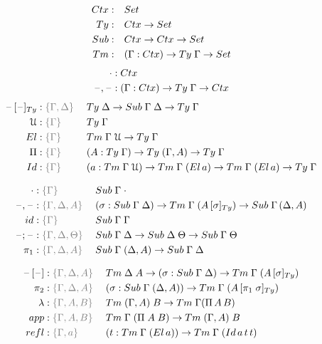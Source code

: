 \documentclass[a4paper,UKenglish,numberwithinsect,cleveref,thm-restate]{lipics-v2021}
\begin{document}
\begin{alignat*}{3}
  \Ctx      & : && \Set                   \\
  \Ty       & : && \Ctx \to \Set          \\
  \Sub      & : && \Ctx \to \Ctx \to \Set \\
  \Tm       & : && (\Gamma : \Ctx) \to \Ty\;\Gamma \to \Set
\end{alignat*}
\begin{alignat*}{5}
  \emptyctx     & : \Ctx \\
  \blank,\blank & : (\Gamma : \Ctx) \to \Ty\;\Gamma \to \Ctx
\end{alignat*}
\begin{alignat*}{5}
\subTy{\blank}{\blank} & : \implicit{\Gamma, \Delta}\; && \Ty\;\Delta \to \Sub\;\Gamma\;\Delta \to \Ty\;\Gamma \\
  \UU         & : \implicit{\Gamma}\; && \Ty\; \Gamma \\
  \El         & : \implicit{\Gamma}\; && \Tm\;\Gamma\;\UU \to \Ty\;\Gamma \\
  \Pi         & : \implicit{\Gamma}\; && (A : \Ty\;\Gamma) \to \Ty\;(\Gamma, A) \to \Ty\;\Gamma \\
  \mathsf{Id} & : \implicit{\Gamma}\; && (a : \Tm\;\Gamma\;\UU) \to \Tm\;\Gamma\;(\El\,a) \to \Tm\;\Gamma\;(\El\,a) \to \Ty\;\Gamma
\end{alignat*}

\begin{alignat*}{5}
  \emptysub & : \implicit{\Gamma} && \Sub\;\Gamma\;\emptyctx \\
  \blank,\blank & : \implicit{\Gamma, \Delta, A} && (\sigma : \Sub\;\Gamma\;\Delta) \to \Tm\;\Gamma\;(\subTy{A}{\sigma}) \to \Sub\;\Gamma\,(\Delta, A) \\
  \idS & : \implicit{\Gamma} && \Sub\;\Gamma\;\Gamma \\
  \blank;\blank & : \implicit{\Gamma, \Delta, \Theta} && \Sub\;\Gamma\;\Delta \to \Sub\;\Delta\;\Theta \to \Sub\;\Gamma\;\Theta \\
  \pi_1 & : \implicit{\Gamma, \Delta, A}\; && \Sub\;\Gamma\;(\Delta, A) \to \Sub\;\Gamma\;\Delta
\end{alignat*}


\begin{alignat*}{5}
  \sub{\blank}{\blank} & : \implicit{\Gamma,\Delta, A} && \Tm\;\Delta\;A \to (\sigma : \Sub\;\Gamma\;\Delta) \to \Tm\;\Gamma\;(\subTy{A}{\sigma}) \\
  \pi_2 & : \implicit{\Gamma, \Delta, A}\; && (\sigma : \Sub\;\Gamma\;(\Delta, A)) \to \Tm\;\Gamma\;(\subTy{A}{\pi_1\;\sigma}) \\
  \lambda         &: \implicit{\Gamma, A, B} \; && \Tm\;(\Gamma, A)\;B \to \Tm\;\Gamma(\Pi\,A\,B) \\
  \mathsf{app}    &: \implicit{\Gamma, A, B} \; && \Tm\;\Gamma\;(\Pi\;A\;B) \to \Tm\;(\Gamma, A)\;B \\
  \mathsf{refl} & : \implicit{\Gamma, a}\;&&(t : \Tm\;\Gamma\;(\El\,a)) \to \Tm\;\Gamma\;(\mathsf{Id}\,a\,t\,t)
\end{alignat*}
\end{document}
